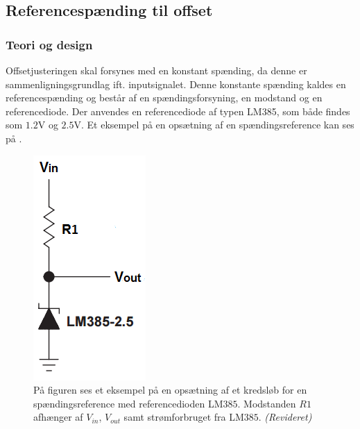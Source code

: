 \subsection{Referencespænding til offset}\label{subsec:Spaendingsref}
\subsubsection{Teori og design}
Offsetjusteringen skal forsynes med en konstant spænding, da denne er sammenligningsgrundlag ift. inputsignalet. Denne konstante spænding kaldes en referencespænding og består af en spændingsforsyning, en modstand og en referencediode. Der anvendes en referencediode af typen LM385, som både findes som $1.2$V og $2.5$V. Et eksempel på en opsætning af en spændingsreference kan ses på .

\begin{figure}[H]
	\centering
	\includegraphics[scale=0.7]{figures/cProblemloesning/ReferenceEksempel.PNG}
	\caption{På figuren ses et eksempel på en opsætning af et kredsløb for en spændingsreference med referencedioden LM$385$. Modstanden $R1$ afhænger af $V_{in}$, $V_{out}$ samt strømforbruget fra LM$385$. \textit{(Revideret)} \cite{National2005}}
	\label{fig:Spaendingsreference}
\end{figure}

